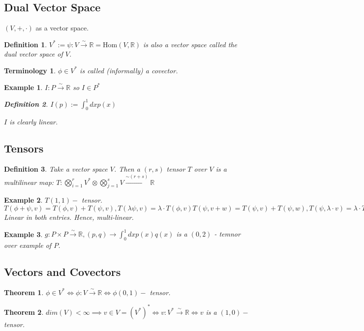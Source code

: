 \documentclass[10pt, oneside]{article}
\newcommand{\R}{\mathbb{R}}
\newtheorem{thm}{Theorem}
\newtheorem{defn}{Definition}
\newtheorem{example}{Example}
\newtheorem{Terminology}{Terminology}
\begin{document}
      \subsection*{Dual Vector Space}
         $(V,+,\cdot)$ as a vector space.
         \begin{defn}
            $V^* := {\psi: V \xrightarrow{\sim} \R} = \text{Hom} (V,\R)$ is also a vector space called the dual vector space of $V$.
         \end{defn}
         \begin{Terminology}
            $\phi \in V^*$ is called (informally) a covector.
         \end{Terminology}
         \begin{example}
         $I: P \xrightarrow{\sim} \R$ so $I \in P^*$
         \begin{defn}
            $I(p) := \int_{0}^{1}dxp(x)$
         \end{defn}
         $I$ is clearly linear.
         \end{example}
      \subsection*{Tensors}
      \begin{defn}
         Take a vector space $V$. Then a $(r,s)$ tensor $T$ over $V$ is a multilinear map: $T: \bigotimes_{i=1}^{r} V^* \otimes \bigotimes_{j=1}^{s} V \xrightarrow{\sim (r+s)} \R$
      \end{defn}
      \begin{example}
         $T (1,1) - $ tensor. $T(\phi+\psi,v) = T(\phi,v)+T(\psi,v), T(\lambda \psi,v)=\lambda\cdot T(\phi,v) T(\psi,v+w)=T(\psi,v)+T(\psi,w), T(\psi,\lambda\cdot v)= \lambda \cdot T(\psi,v)$ Linear in both entries. Hence, multi-linear.
      \end{example}
      \begin{example}
         $g: P \times P \xrightarrow{\sim} \R, (p,q) \rightarrow \int_{0}^{1}dx p(x) q(x)$ is a $(0,2)$ - temnor over example of $P$.
      \end{example}
      \subsection*{Vectors and Covectors}
         \begin{thm}
            $\phi \in V^* \iff \phi: V \xrightarrow{\sim} \R \iff \phi(0,1) - $ tensor.
         \end{thm}
         \begin{thm}
            $dim(V) < \infty \implies v \in V = (V^*)^* \iff v: V^* \xrightarrow{\sim} \R \iff v$ is a $(1,0) -$ tensor. 
         \end{thm}
\end{document}

